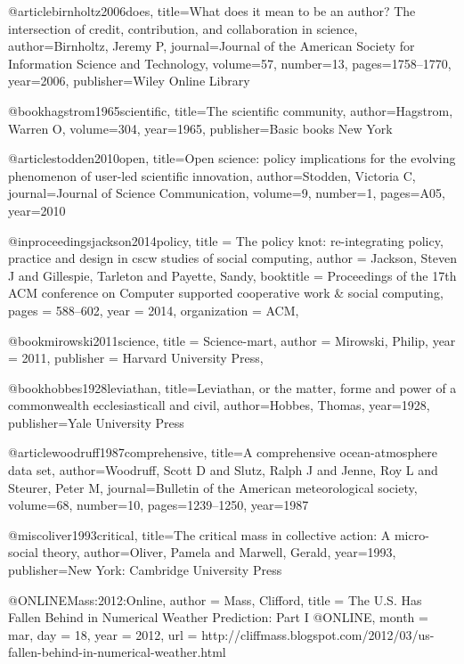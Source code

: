 @article{birnholtz2006does,
  title={What does it mean to be an author? The intersection of credit, contribution, and collaboration in science},
  author={Birnholtz, Jeremy P},
  journal={Journal of the American Society for Information Science and Technology},
  volume={57},
  number={13},
  pages={1758--1770},
  year={2006},
  publisher={Wiley Online Library}
}


@book{hagstrom1965scientific,
  title={The scientific community},
  author={Hagstrom, Warren O},
  volume={304},
  year={1965},
  publisher={Basic books New York}
}

@article{stodden2010open,
  title={Open science: policy implications for the evolving phenomenon of user-led scientific innovation},
  author={Stodden, Victoria C},
  journal={Journal of Science Communication},
  volume={9},
  number={1},
  pages={A05},
  year={2010}
}

@inproceedings{jackson2014policy,
  title = {{The policy knot: re-integrating policy, practice and design in cscw studies of social computing}},
  author = {Jackson, Steven J and Gillespie, Tarleton and Payette, Sandy},
  booktitle = {Proceedings of the 17th ACM conference on Computer supported cooperative work \& social computing},
  pages = {588--602},
  year = {2014},
  organization = {ACM},
}


@book{mirowski2011science,
  title = {{Science-mart}},
  author = {Mirowski, Philip},
  year = {2011},
  publisher = {Harvard University Press},
}


@book{hobbes1928leviathan,
  title={Leviathan, or the matter, forme and power of a commonwealth ecclesiasticall and civil},
  author={Hobbes, Thomas},
  year={1928},
  publisher={Yale University Press}
}

@article{woodruff1987comprehensive,
  title={A comprehensive ocean-atmosphere data set},
  author={Woodruff, Scott D and Slutz, Ralph J and Jenne, Roy L and Steurer, Peter M},
  journal={Bulletin of the American meteorological society},
  volume={68},
  number={10},
  pages={1239--1250},
  year={1987}
}

@misc{oliver1993critical,
  title={The critical mass in collective action: A micro-social theory},
  author={Oliver, Pamela and Marwell, Gerald},
  year={1993},
  publisher={New York: Cambridge University Press}
}

@ONLINE{Mass:2012:Online,
author = {Mass, Clifford},
title = {The U.S. Has Fallen Behind in Numerical Weather Prediction: Part I {@ONLINE}},
month = mar,
day = {18},
year = {2012},
url = {http://cliffmass.blogspot.com/2012/03/us-fallen-behind-in-numerical-weather.html}
}

